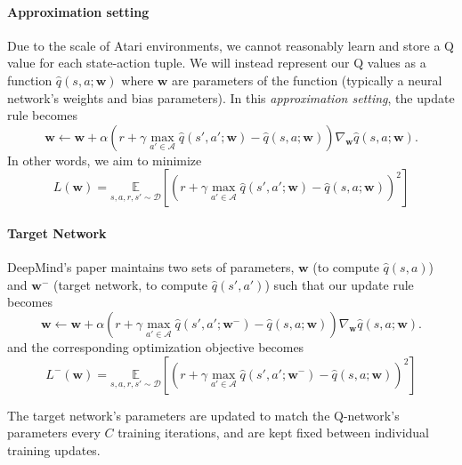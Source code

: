 \documentclass{article}
\begin{document}
\paragraph{Approximation setting}
Due to the scale of Atari environments, we cannot reasonably learn and store a Q value for each state-action tuple. We will instead represent our Q values as a function $ \hat{q}(s, a; \mathbf{w}) $ where $ \mathbf{w} $ are parameters of the function (typically a neural network's weights and bias parameters). In this \emph{approximation setting}, the update rule becomes
\begin{equation}
\label{eq2}
\mathbf{w} \leftarrow \mathbf{w} + \alpha\left(r+\gamma \max_{a' \in \mathcal{A}} \hat{q}\left(s', a'; \mathbf{w} \right) - \hat{q}\left(s, a; \mathbf{w} \right)\right) \nabla_{\mathbf{w}}\hat{q}(s, a; \mathbf{w}).
\end{equation}
In other words, we aim to minimize
\begin{equation}
L(\mathbf{w}) = \underset{s,a,r,s' \sim \mathcal{D}}{\mathbb{E}}\left[\left(r+\gamma \max_{a' \in \mathcal{A}}\hat{q}\left(s', a'; \mathbf{w} \right) - \hat{q}(s, a; \mathbf{w})\right)^2\right]
\end{equation}

\paragraph{Target Network}
DeepMind's paper \cite{mnih2015human} \cite{mnih-atari-2013} maintains two sets of parameters, $\mathbf{w}$ (to compute $ \hat{q}(s, a)$) and $\mathbf{w}^-$ (target network, to compute $ \hat{q}(s', a') $) such that our update rule becomes
 \begin{equation}
\mathbf{w} \leftarrow \mathbf{w} + \alpha\left(r+\gamma \max_{a' \in \mathcal{A}}\hat{q}\left(s', a'; \mathbf{w}^- \right) - \hat{q}\left(s, a; \mathbf{w} \right)\right) \nabla_{\mathbf{w}} \hat{q}(s, a; \mathbf{w}).
\end{equation}
and the corresponding optimization objective becomes
\begin{equation}
L^{-}(\mathbf{w}) = \underset{s,a,r,s' \sim \mathcal{D}}{\mathbb{E}}\left[\left(r+\gamma \max_{a' \in \mathcal{A}}\hat{q}\left(s', a'; \mathbf{w^-} \right) - \hat{q}(s, a; \mathbf{w})\right)^2\right]
\end{equation}

The target network's parameters are updated to match the Q-network's parameters every $C$ training iterations, and are kept fixed between individual training updates.
\end{document}
